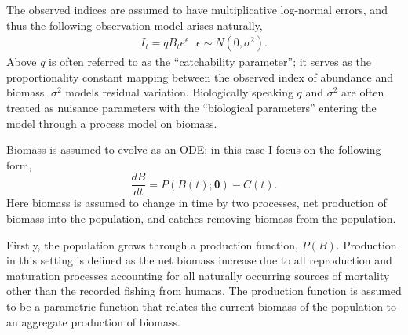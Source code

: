 \documentclass[12pt]{article}
\begin{document}
%
The observed indices are assumed to have multiplicative log-normal errors, and thus
the following observation model arises naturally,
\begin{align}
I_t = q B_t e^\epsilon ~~~ \epsilon\sim N(0, \sigma^2).
\end{align}
%
Above $q$ is often referred to as the ``catchability parameter''; it serves as the %
proportionality constant mapping between the observed index of abundance and biomass. 
$\sigma^2$ models residual variation. Biologically speaking $q$ and $\sigma^2$ 
are often treated as nuisance parameters with the ``biological parameters'' 
entering the model through a process model on biomass.

% 
Biomass is assumed to evolve as an ODE; in this case I focus on the following 
form,
%
\begin{equation}
\frac{dB}{dt} = P(B(t); \bm{\theta}) - C(t). \label{ode}
\end{equation}
Here biomass is assumed to change in time by two processes, net production of 
biomass into the population, and catches removing biomass from the population.

Firstly, the population grows through a production function, $P(B)$. Production 
in this setting is defined as the net biomass increase due to all reproduction 
and maturation processes accounting for all naturally occurring %
sources of mortality other than the recorded fishing from humans. The 
production function is assumed to be a parametric function that relates the 
current biomass of the population to an aggregate production of biomass. 
\end{document}

